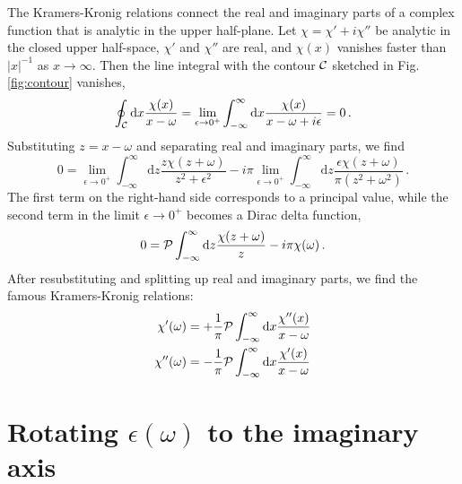 \documentclass[twocolumn,superscriptaddress,pre]{revtex4-1}
\begin{document}
The Kramers-Kronig relations connect the real and imaginary parts of a complex
function that is analytic in the upper half-plane. Let $\chi=\chi'+i\chi''$ be
analytic in the closed upper half-space, $\chi'$ and $\chi''$ are real, and
$\chi(x)$ vanishes faster than $|x|^{-1}$ as $x\to\infty$. Then the line
integral with the contour $\cal C$ sketched in Fig. \ref{fig:contour} vanishes,
\begin{equation}
\oint_{\cal C} \mathrm{d}x \frac{\chi(x)}{x-\omega} = \lim_{\epsilon\to0^+} \int_{-\infty}^\infty \mathrm{d}x \frac{\chi(x)}{x-\omega+i\epsilon} = 0 \,.
\end{equation}
Substituting $z=x-\omega$ and separating real and imaginary parts, we find
\begin{equation}
0 = \lim_{\epsilon\to0^+}\int_{-\infty}^\infty \mathrm{d}z \frac{z \chi(z+\omega)}{z^2+\epsilon^2} - i\pi \lim_{\epsilon\to0^+} \int_{-\infty}^\infty \mathrm{d}z \frac{\epsilon \chi(z+\omega)}{\pi(z^2+\omega^2)} \,.
\end{equation}
The first term on the right-hand side corresponds to a principal value, while
the second term in the limit $\epsilon\to0^+$ becomes a Dirac delta function,
\begin{equation}
0 = {\cal P} \int_{-\infty}^\infty \mathrm{d}z \frac{\chi(z+\omega)}{z} - i\pi \chi(\omega) \,.
\end{equation}
After resubstituting and splitting up real and imaginary parts, we find the
famous Kramers-Kronig relations:
\begin{align}
\label{eq:KK1}
\chi'(\omega)  &= +\frac{1}{\pi} {\cal P} \int_{-\infty}^\infty \mathrm{d}x \frac{\chi''(x)}{x-\omega} \\
\label{eq:KK2}
\chi''(\omega) &= -\frac{1}{\pi} {\cal P} \int_{-\infty}^\infty \mathrm{d}x \frac{\chi'(x) }{x-\omega}
\end{align}


\section{Rotating $\epsilon(\omega)$ to the imaginary axis}
\end{document}
